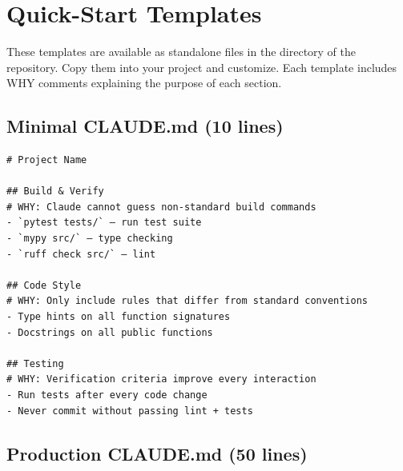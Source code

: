 \chapter{Quick-Start Templates}
\label{app:templates}

These templates are available as standalone files in the 
directory of the repository. Copy them into your project and customize.
Each template includes WHY comments explaining the purpose of each section.

\section{Minimal CLAUDE.md (10 lines)}

\begin{verbatim}
# Project Name

## Build & Verify
# WHY: Claude cannot guess non-standard build commands
- `pytest tests/` — run test suite
- `mypy src/` — type checking
- `ruff check src/` — lint

## Code Style
# WHY: Only include rules that differ from standard conventions
- Type hints on all function signatures
- Docstrings on all public functions

## Testing
# WHY: Verification criteria improve every interaction
- Run tests after every code change
- Never commit without passing lint + tests
\end{verbatim}

\section{Production CLAUDE.md (50 lines)}

